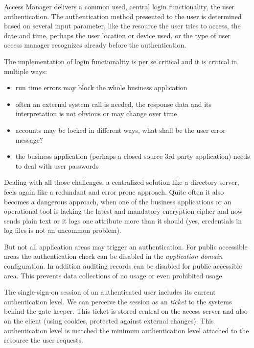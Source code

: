 \documentclass[11pt]{report}
\begin{document}
Access Manager delivers a common used, central login functionality, the
user authentication. The authentication method presented to the user is
determined based on several input parameter, like the resource the user
tries to access, the date and time, perhaps the user location or device
used, or the type of user access manager recognizes already
before the authentication.

The implementation of login functionality is per se critical and it is
critical in multiple ways:

\begin{itemize}

    \item run time errors may block the whole business application

    \item often an external system call is needed, the response data 
        and its interpretation is not obvious or may change over time

    \item accounts may be locked in different ways, what shall be the 
        user error message?

    \item the business application (perhaps a closed source 3rd party
        application) needs to deal with user passwords

\end{itemize}

Dealing with all those challenges, a centralized solution like a
directory server, feels again like a redundant and error prone approach.
Quite often it also becomes a dangerous approach, when one of the
business applications or an operational tool is lacking the latest and
mandatory encryption cipher and now sends plain text or it logs one
attribute more than it should (yes, credentials in log files is not an
uncommon problem).


But not all application areas may trigger an authentication.  For public
accessible areas the authentication check can be disabled in the
\emph{application domain} configuration. In addition auditing records
can be disabled for public accessible area.  This prevents data
collections of no usage or even prohibited usage.

The single-sign-on session of an authenticated user includes its current
authentication level.  We can perceive the session as an \emph{ticket}
to the systems behind the gate keeper.  This ticket is stored central on
the access server and also on the client (using cookies, protected
against external changes). This authentication level is matched the
minimum authentication level attached to the resource the user requests.
\end{document}
